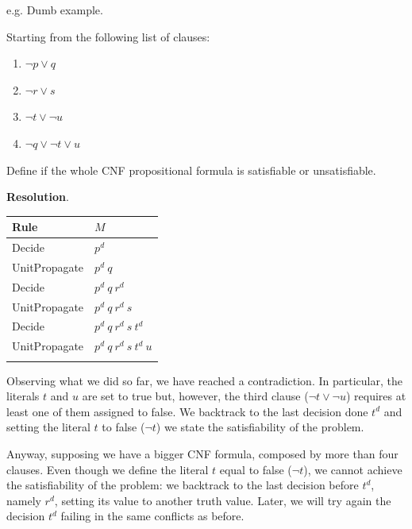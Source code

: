 \begin{example}
    e.g. Dumb example. \vspace{7pt}

    Starting from the following list of clauses:
    \begin{enumerate}
        \item $\neg p \vee q$
        \item $\neg r \vee s$
        \item $\neg t \vee \neg u$
        \item $\neg q \vee \neg t \vee u$
    \end{enumerate} \vspace{3.5pt}
    Define if the whole CNF propositional formula is satisfiable or unsatisfiable. \vspace{7pt}

    \textbf{Resolution}. \vspace{7pt}
    \begin{center}
        \begin{tabular}{|p{2.75cm}|p{5cm}|}          
            \hline
                \textbf{Rule} & $M$\\ 
            \hline
                Decide & $p^d$ \\
            \hline
                UnitPropagate & $p^d \ q$ \\
            \hline
                Decide & $p^d \ q \ r^d$ \\
            \hline
                UnitPropagate & $p^d \ q \ r^d \ s$ \\
            \hline
                Decide & $p^d \ q \ r^d \ s \ t^d$  \\
            \hline
                UnitPropagate & $p^d \ q \ r^d \ s \ t^d \ u$  \\
            \hline
                & \\
            \hline
        \end{tabular}
    \end{center} \vspace{7pt}
    Observing what we did so far, we have reached a contradiction. In particular, the literals $t$ and $u$ are set to true but, however, the third clause
    ($\neg t \vee \neg u$) requires at least one of them assigned to false. We backtrack to the last decision done $t^d$ and setting the literal $t$ to 
    false ($\neg t$) we state the satisfiability of the problem. \vspace{7pt}

    Anyway, supposing we have a bigger CNF formula, composed by more than four clauses. Even though we define the literal $t$ equal to false ($\neg t$), 
    we cannot achieve the satisfiability of the problem: we backtrack to the last decision before $t^d$, namely $r^d$, setting its value to another 
    truth value. Later, we will try again the decision $t^d$ failing in the same conflicts as before. \vspace{7pt}
    

\end{example}
